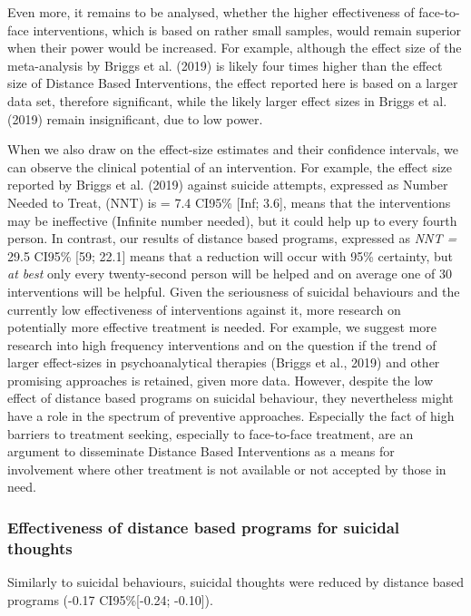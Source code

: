 \documentclass[
  english,
  man]{apa6}
\begin{document}
Even more, it remains to be analysed, whether the higher effectiveness of face-to-face interventions, which is based on rather small samples, would remain superior when their power would be increased. For example, although the effect size of the meta-analysis by Briggs et al. (2019) is likely four times higher than the effect size of Distance Based Interventions, the effect reported here is based on a larger data set, therefore significant, while the likely larger effect sizes in Briggs et al. (2019) remain insignificant, due to low power.

When we also draw on the effect-size estimates and their confidence intervals, we can observe the clinical potential of an intervention. For example, the effect size reported by Briggs et al. (2019) against suicide attempts, expressed as Number Needed to Treat, (NNT) is = 7.4 CI95\% {[}Inf; 3.6{]}, means that the interventions may be ineffective (Infinite number needed), but it could help up to every fourth person. In contrast, our results of distance based programs, expressed as \emph{NNT =} 29.5 CI95\% {[}59; 22.1{]} means that a reduction will occur with 95\% certainty, but \emph{at best} only every twenty-second person will be helped and on average one of 30 interventions will be helpful. Given the seriousness of suicidal behaviours and the currently low effectiveness of interventions against it, more research on potentially more effective treatment is needed. For example, we suggest more research into high frequency interventions and on the question if the trend of larger effect-sizes in psychoanalytical therapies (Briggs et al., 2019) and other promising approaches is retained, given more data. However, despite the low effect of distance based programs on suicidal behaviour, they nevertheless might have a role in the spectrum of preventive approaches. Especially the fact of high barriers to treatment seeking, especially to face-to-face treatment, are an argument to disseminate Distance Based Interventions as a means for involvement where other treatment is not available or not accepted by those in need.

\hypertarget{effectiveness-of-distance-based-programs-for-suicidal-thoughts}{%
\subsubsection{Effectiveness of distance based programs for suicidal thoughts}\label{effectiveness-of-distance-based-programs-for-suicidal-thoughts}}

Similarly to suicidal behaviours, suicidal thoughts were reduced by distance based programs (-0.17 CI95\%{[}-0.24; -0.10{]}).
\end{document}
